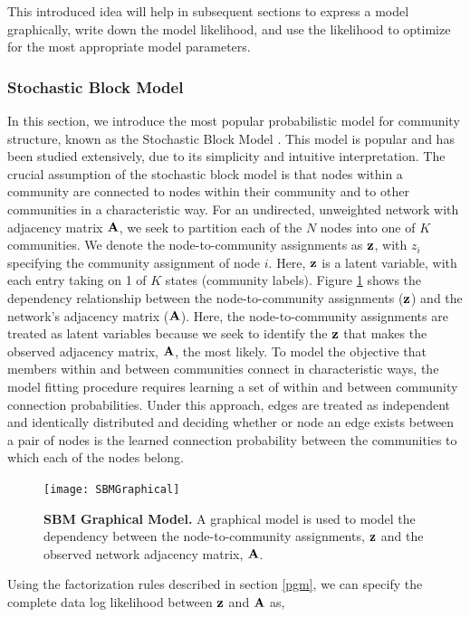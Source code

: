 This introduced idea will help in subsequent sections to express a model graphically, write down the model likelihood, and use the likelihood to optimize for the most appropriate model parameters. 

\subsubsection{Stochastic Block Model}
In this section, we introduce the most popular  probabilistic model for community structure, known as the Stochastic Block Model \cite{sbmorig}. This model is popular and has been studied extensively, due to its simplicity and intuitive interpretation. The crucial assumption of the stochastic block model is that nodes within a community are connected to nodes within their community and to other communities in a characteristic way. For an undirected, unweighted network with adjacency matrix ${\bf A}$, we seek to partition each of the $N$ nodes into one of $K$ communities. We denote the node-to-community assignments as ${\bf z}$, with $z_{i}$ specifying the community assignment of node $i$. Here, ${\bf z}$ is a latent variable, with each entry taking on 1 of $K$ states (community labels). Figure \ref{fig:graphical} shows the dependency relationship between the node-to-community assignments (${\bf z}$) and the network's adjacency matrix (${\bf A}$). Here, the node-to-community assignments are treated as latent variables because we seek to identify the ${\bf z}$ that makes the observed adjacency matrix, ${\bf A}$, the most likely. To model the objective that members within and between communities connect in characteristic ways, the model fitting procedure requires learning a set of within and between community connection probabilities. Under this approach, edges are treated as independent and identically distributed and deciding whether or node an edge exists between a pair of nodes is the learned connection probability between the communities to which each of the nodes belong.

\begin{figure}
\begin{center}
\texttt{[image: SBMGraphical]}
\caption{{\bf SBM Graphical Model.} A graphical model is used to model the dependency between the node-to-community assignments, ${\bf z}$ and the observed network adjacency matrix, ${\bf A}$.}
\label{fig:graphical}
\end{center}
\end{figure}

Using the factorization rules described in section \ref{pgm}, we can specify the complete data log likelihood between ${\bf z}$ and ${\bf A}$ as,

